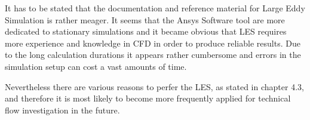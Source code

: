It has to be stated that the documentation and reference material for Large Eddy Simulation is rather meager. It seems that the Ansys Software tool are more dedicated to stationary simulations and it became obvious that LES requires more experience and knowledge in CFD in order to produce reliable results. Due to the long calculation durations it appears rather cumbersome and errors in the simulation setup can cost a vast amounts of time.

Nevertheless there are various reasons to perfer the LES, as stated in chapter 4.3, and therefore it is most likely to become more frequently applied for technical flow investigation in the future.
